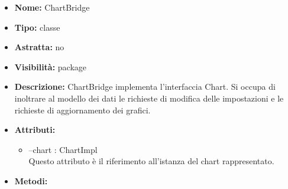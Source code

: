 			
			\begin{itemize}
			\item \textbf{Nome:} ChartBridge
			\item \textbf{Tipo:} classe
			
		\item \textbf{Astratta:}
		no
			\item \textbf{Visibilità:} package
			\item \textbf{Descrizione:} ChartBridge implementa l'interfaccia Chart. Si occupa di inoltrare al modello dei dati le richieste di modifica delle impostazioni e le richieste di aggiornamento dei grafici.
			\item \textbf{Attributi:}
				\begin{itemize}
				\setlength{\itemsep}{5pt}
				
					\item[\ding{111}] {--chart : ChartImpl} \\ [1mm] Questo attributo è il riferimento all'istanza del chart rappresentato.
				\end{itemize}
		
			\item \textbf{Metodi:}
				\begin{itemize}
				\setlength{\itemsep}{5pt}
				

\end{itemize}
\end{itemize}
